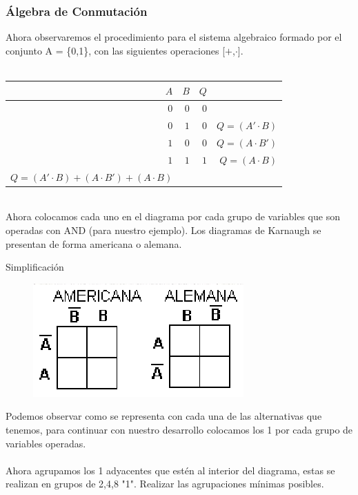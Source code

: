 \documentclass[aspectratio=169]{beamer}
\begin{document}
\begin{frame}
\frametitle{Álgebra de Conmutación}

Ahora observaremos el procedimiento para el sistema algebraico formado por el conjunto A = \{0,1\}, con las siguientes operaciones [\textcolor{ITMOtomato}{\(+\)},\textcolor{ITMOtomato}{\(\cdot\)}].\\
\hspace{2px}\\

\begin{tabular}{|r r | r| r|} 
    $A$ & $B$ & $Q$ & \\ \hline
    $0$ & $0$ & $0$ & \\
    $0$ & $1$ & $0$ & $Q=(A'\cdot B)$\\
    $1$ & $0$ & $0$ & $Q=(A\cdot B')$\\
    $1$ & $1$ & $1$ & $Q=(A\cdot B)$\\
    $Q=(A'\cdot B)+(A\cdot B')+(A\cdot B)$
\end{tabular}   

\hspace{2px}
\\Ahora colocamos cada uno en el diagrama por cada grupo de variables que son operadas con AND (para nuestro ejemplo). Los diagramas de Karnaugh se presentan de forma americana o alemana.
\end{frame}

\begin{frame}{Simplificación }
    \begin{figure}
        \includegraphics[scale=.4]{fig/kar_1.png}
    \end{figure}
    Podemos observar como se representa con cada una de las alternativas que tenemos, para continuar con nuestro desarrollo colocamos los 1 por cada grupo de variables operadas.\\
    \\Ahora agrupamos los 1 adyacentes que estén al interior del diagrama, estas se realizan en grupos de 2,4,8 "1". Realizar las agrupaciones mínimas posibles.
\end{frame}
\end{document}
